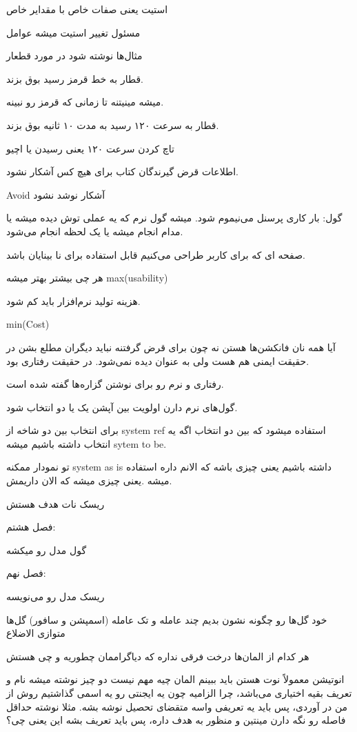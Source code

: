 استیت یعنی صفات خاص با مقدایر خاص

مسئول تغییر استیت میشه عوامل

مثال‌ها نوشته شود در مورد قطعار

قطار به خط قرمز رسید بوق بزند.

میشه مینیتنه تا زمانی که قرمز رو نبینه.

قطار به سرعت ۱۲۰ رسید به مدت ۱۰ ثانیه بوق بزند.

تاچ کردن سرعت ۱۲۰ یعنی رسیدن یا اچیو

اطلاعات قرض گیرندگان کتاب برای هیچ کس آشکار نشود.

Avoid آشکار نوشد نشود

گول: بار کاری پرسنل می‌نیموم شود.
میشه گول نرم
که یه عملی توش دیده میشه
یا مدام انجام میشه
یا یک لحظه انجام می‌شود.

صفحه ای که برای کاربر طراحی می‌کنیم قابل استفاده برای نا بینایان باشد.

هر چی بیشتر بهتر میشه max(usability)

هزینه تولید نرم‌افزار باید کم شود.

min(Cost)

آیا همه نان فانکشن‌ها هستن نه
چون برای قرض گرفتنه نباید دیگران مطلع بشن در حقیقت ایمنی هم هست ولی به عنوان
 دیده نمی‌شود. در حقیقت رفتاری بود.

رفتاری و نرم رو برای نوشتن گزاره‌ها گفته شده است.

گول‌های نرم دارن اولویت بین آپشن یک یا دو انتخاب شود.

برای انتخاب بین دو شاخه از system ref استفاده میشود که بین دو انتخاب اگه یه
انتخاب داشته باشیم میشه sytem to be.

تو نمودار ممکنه system as is داشته باشیم یعنی چیزی باشه که الانم داره استفاده
میشه .یعنی چیزی میشه که الان داریمش.


ریسک نات هدف هستش

فصل هشتم:

گول مدل رو میکشه

فصل نهم:

ریسک مدل رو می‌نویسه

خود گل‌ها رو چگونه نشون بدیم
چند عامله و تک عامله (اسمپشن و سافور) گل‌ها متوازی الاضلاع

هر کدام از المان‌ها درخت فرقی نداره که دیاگراممان چطوریه و چی هستش

انوتیشن معمولاً نوت هستن باید ببینم المان چیه مهم نیست دو چیز نوشته میشه نام و
تعریف بقیه اختیاری می‌باشد، چرا الزامیه چون یه ایجنتی رو یه اسمی گذاشتیم روش از
من در آوردی، پس باید یه تعریفی واسه متقضای تحصیل نوشه بشه. مثلا نوشته حداقل
فاصله رو نگه دارن مینتین و منظور به هدف داره، پس باید تعریف بشه این یعنی چی؟

